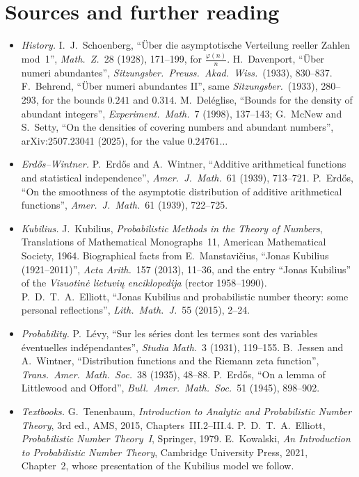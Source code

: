 \section*{Sources and further reading}

\begin{itemize}
\item \emph{History.} I.~J.~Schoenberg, ``Über die asymptotische Verteilung reeller Zahlen mod~1'', \emph{Math.\ Z.}\ 28 (1928), 171--199, for $\frac{\varphi(n)}n$. H.~Davenport, ``Über numeri abundantes'', \emph{Sitzungsber.\ Preuss.\ Akad.\ Wiss.}\ (1933), 830--837. F.~Behrend, ``Über numeri abundantes II'', same \emph{Sitzungsber.}\ (1933), 280--293, for the bounds $0.241$ and $0.314$. M.~Deléglise, ``Bounds for the density of abundant integers'', \emph{Experiment.\ Math.}\ 7 (1998), 137--143; G.~McNew and S.~Setty, ``On the densities of covering numbers and abundant numbers'', arXiv:2507.23041 (2025), for the value $0.24761\ldots$
\item \emph{Erd\H{o}s--Wintner.} P.~Erd\H{o}s and A.~Wintner, ``Additive arithmetical functions and statistical independence'', \emph{Amer.\ J.\ Math.}\ 61 (1939), 713--721. P.~Erd\H{o}s, ``On the smoothness of the asymptotic distribution of additive arithmetical functions'', \emph{Amer.\ J.\ Math.}\ 61 (1939), 722--725.
\item \emph{Kubilius.} J.~Kubilius, \emph{Probabilistic Methods in the Theory of Numbers}, Translations of Mathematical Monographs~11, American Mathematical Society, 1964. Biographical facts from E.~Manstavičius, ``Jonas Kubilius (1921--2011)'', \emph{Acta Arith.}\ 157 (2013), 11--36, and the entry ``Jonas Kubilius'' of the \emph{Visuotinė lietuvių enciklopedija} (rector 1958--1990). P.~D.~T.~A.~Elliott, ``Jonas Kubilius and probabilistic number theory: some personal reflections'', \emph{Lith.\ Math.\ J.}\ 55 (2015), 2--24.
\item \emph{Probability.} P.~L\'evy, ``Sur les séries dont les termes sont des variables éventuelles indépendantes'', \emph{Studia Math.}\ 3 (1931), 119--155. B.~Jessen and A.~Wintner, ``Distribution functions and the Riemann zeta function'', \emph{Trans.\ Amer.\ Math.\ Soc.}\ 38 (1935), 48--88. P.~Erd\H{o}s, ``On a lemma of Littlewood and Offord'', \emph{Bull.\ Amer.\ Math.\ Soc.}\ 51 (1945), 898--902.
\item \emph{Textbooks.} G.~Tenenbaum, \emph{Introduction to Analytic and Probabilistic Number Theory}, 3rd ed., AMS, 2015, Chapters~III.2--III.4. P.~D.~T.~A.~Elliott, \emph{Probabilistic Number Theory~I}, Springer, 1979. E.~Kowalski, \emph{An Introduction to Probabilistic Number Theory}, Cambridge University Press, 2021, Chapter~2, whose presentation of the Kubilius model we follow.
\end{itemize}

